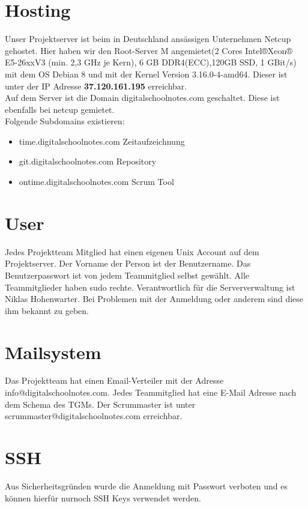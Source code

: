 \documentclass[12pt,a4paper,oneside,ngerman]{scrartcl}
\begin{document}
\section{Hosting}
Unser Projektserver ist beim in Deutschland ansässigen Unternehmen Netcup\cite{NETCUP:1} gehostet. Hier haben wir den Root-Server M angemietet(2 Cores Intel®Xeon® E5-26xxV3
(min. 2,3 GHz je Kern), 6 GB DDR4(ECC),120GB SSD, 1 GBit/s)\cite{NETCUP:2} mit dem OS Debian 8 und mit der Kernel Version 3.16.0-4-amd64. Dieser ist unter der IP Adresse \textbf{37.120.161.195} erreichbar.\\

Auf dem Server ist die Domain digitalschoolnotes.com geschaltet. Diese ist ebenfalls bei netcup gemietet.\\

Folgende Subdomains existieren:

\begin{itemize}
\item time.digitalschoolnotes.com \hfill Zeitaufzeichnung
\item git.digitalschoolnotes.com \hfill Repository
\item ontime.digitalschoolnotes.com \hfill Scrum Tool
\end{itemize}

\section{User}
Jedes Projektteam Mitglied hat einen eigenen Unix Account auf dem Projektserver. Der Vorname der Person ist der Benutzername. Das Benutzerpasswort ist von jedem Teammitglied selbst gewählt. Alle Teammitglieder haben sudo rechte. Verantwortlich für die Serververwaltung ist Niklas Hohenwarter. Bei Problemen mit der Anmeldung oder anderem sind diese ihm bekannt zu geben.

\section{Mailsystem}
Das Projektteam hat einen Email-Verteiler mit der Adresse info@digitalschoolnotes.com. Jedes Teammitglied hat eine E-Mail Adresse nach dem Schema des TGMs. Der Scrummaster ist unter scrummaster@digitalschoolnotes.com erreichbar.

\section{SSH}
Aus Sicherheitsgründen wurde die Anmeldung mit Passwort verboten und es können hierfür nurnoch SSH Keys verwendet werden.
\newpage
\end{document}
